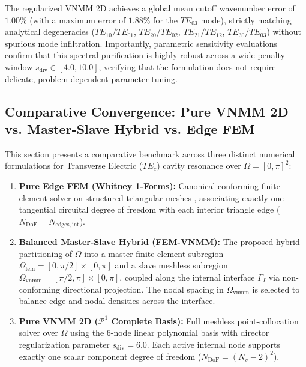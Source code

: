 \documentclass[preprint,12pt]{elsarticle}
\begin{document}
The regularized VNMM 2D achieves a global mean cutoff wavenumber error of $1.00\%$ (with a maximum error of $1.88\%$ for the $TE_{03}$ mode), strictly matching analytical degeneracies ($TE_{10}/TE_{01}$, $TE_{20}/TE_{02}$, $TE_{21}/TE_{12}$, $TE_{30}/TE_{03}$) without spurious mode infiltration. Importantly, parametric sensitivity evaluations confirm that this spectral purification is highly robust across a wide penalty window $s_{\mathrm{div}} \in [4.0, 10.0]$, verifying that the formulation does not require delicate, problem-dependent parameter tuning.

\subsection{Comparative Convergence: Pure VNMM 2D vs. Master-Slave Hybrid vs. Edge FEM}
\label{subsec:convergence_comparison}

This section presents a comparative benchmark across three distinct numerical formulations for Transverse Electric ($TE_z$) cavity resonance over $\Omega = [0, \pi]^2$:
\begin{enumerate}
    \item \textbf{Pure Edge FEM (Whitney 1-Forms):} Canonical conforming finite element solver on structured triangular meshes \cite{monk2003finite}, associating exactly one tangential circuital degree of freedom with each interior triangle edge ($N_{\mathrm{DoF}} = N_{\mathrm{edges, int}}$).
    \item \textbf{Balanced Master-Slave Hybrid (FEM-VNMM):} The proposed hybrid partitioning of $\Omega$ into a master finite-element subregion $\Omega_{\mathrm{fem}} = [0, \pi/2] \times [0, \pi]$ and a slave meshless subregion $\Omega_{\mathrm{vnmm}} = [\pi/2, \pi] \times [0, \pi]$, coupled along the internal interface $\Gamma_I$ via non-conforming directional projection. The nodal spacing in $\Omega_{\mathrm{vnmm}}$ is selected to balance edge and nodal densities across the interface.
    \item \textbf{Pure VNMM 2D ($\mathcal{P}^1$ Complete Basis):} Full meshless point-collocation solver over $\Omega$ using the 6-node linear polynomial basis with director regularization parameter $s_{\mathrm{div}} = 6.0$. Each active internal node supports exactly one scalar component degree of freedom ($N_{\mathrm{DoF}} = (N_v - 2)^2$).
\end{enumerate}
\end{document}
